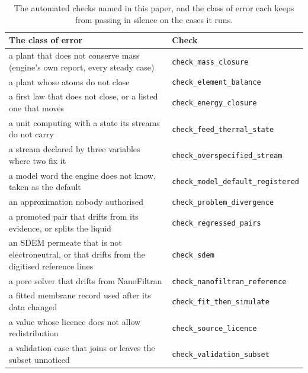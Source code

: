 \documentclass[preprint,12pt]{elsarticle}
\newcommand{\brk}[1]{\nolinkurl{#1}}
\begin{document}
\begin{table}[h]
\centering\scriptsize
\caption{The automated checks named in this paper, and the class of error
each keeps from passing in silence on the cases it runs.}
\label{tab:gates}
\renewcommand{\arraystretch}{1.08}
\begin{tabularx}{\linewidth}{>{\raggedright\arraybackslash}X
                             >{\raggedright\arraybackslash}p{4.4cm}}
\toprule
\textbf{The class of error} & \textbf{Check} \\
\midrule
a plant that does not conserve mass (engine's own report, every steady case)
  & \brk{check_mass_closure} \\
a plant whose atoms do not close & \brk{check_element_balance} \\
a first law that does not close, or a listed one that moves
  & \brk{check_energy_closure} \\
a unit computing with a state its streams do not carry
  & \brk{check_feed_thermal_state} \\
a stream declared by three variables where two fix it
  & \brk{check_overspecified_stream} \\
a model word the engine does not know, taken as the default
  & \brk{check_model_default_registered} \\
an approximation nobody authorised & \brk{check_problem_divergence} \\
a promoted pair that drifts from its evidence, or splits the liquid
  & \brk{check_regressed_pairs} \\
an SDEM permeate that is not electroneutral, or that drifts from the
  digitised reference lines & \brk{check_sdem} \\
a pore solver that drifts from NanoFiltran & \brk{check_nanofiltran_reference} \\
a fitted membrane record used after its data changed
  & \brk{check_fit_then_simulate} \\
a value whose licence does not allow redistribution
  & \brk{check_source_licence} \\
a validation case that joins or leaves the subset unnoticed
  & \brk{check_validation_subset} \\
\bottomrule
\end{tabularx}
\end{table}



\end{document}
